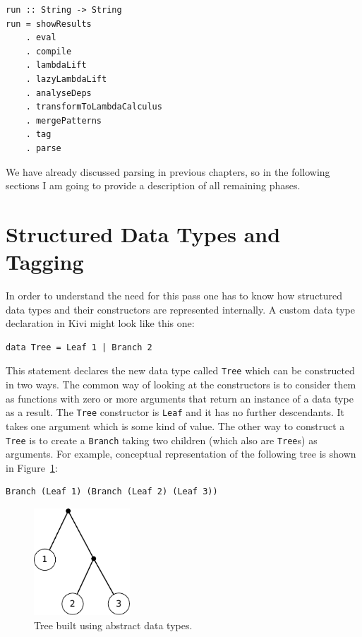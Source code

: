 \documentclass[12pt,a4paper]{report}
\begin{document}
\vspace*{0.2in}
\begin{lstlisting}[style=haskell]
run :: String -> String
run = showResults
    . eval
    . compile
    . lambdaLift
    . lazyLambdaLift
    . analyseDeps
    . transformToLambdaCalculus
    . mergePatterns
    . tag
    . parse
\end{lstlisting}

We have already discussed parsing in previous chapters, so in the following
sections I am going to provide a description of all remaining phases.

\section{Structured Data Types and Tagging}
In order to understand the need for this pass one has to know how structured
data types and their constructors are represented internally.
A custom data type declaration in Kivi might look like this one:

\vspace*{0.2in}
\begin{lstlisting}[style=haskell]
data Tree = Leaf 1 | Branch 2
\end{lstlisting}

This statement declares the new data type called \texttt{Tree} which can be
constructed in two ways. The common way of looking at the constructors is to
consider them as functions with zero or more arguments that return an instance
of a data type as a result. The \texttt{Tree} constructor is \texttt{Leaf} and
it has no further descendants. It takes one argument which is some kind of
value. The other way to construct a \texttt{Tree} is to create a \texttt{Branch}
taking two children (which also are \texttt{Tree}s) as arguments. For example,
conceptual representation of the following tree is shown in Figure~\ref{fig:tree}:

\vspace*{0.2in}
\begin{lstlisting}[style=haskell]
Branch (Leaf 1) (Branch (Leaf 2) (Leaf 3))
\end{lstlisting}

\begin{figure}[h!]
  \centering
  \includegraphics[height=4cm]{tree}
  \caption{Tree built using abstract data types.}
  \label{fig:tree}
\end{figure}
\end{document}
